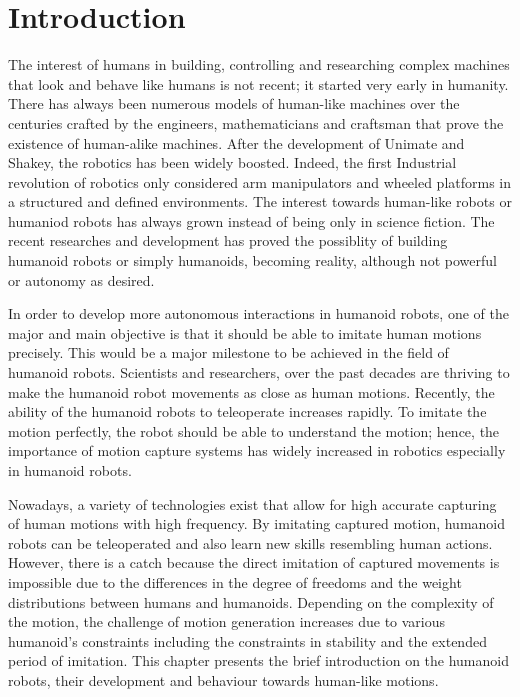 \chapter{Introduction}

The interest of humans in building, controlling and researching complex machines that look and behave like humans is not 
recent; it started very early in humanity. There has always been numerous models of human-like machines over the centuries 
crafted by the engineers, mathematicians and craftsman that prove the existence of human-alike machines. After the development 
of Unimate and Shakey, the robotics has been widely boosted. Indeed, the first Industrial revolution of robotics only considered 
arm manipulators and wheeled platforms in a structured and defined environments. The interest towards human-like robots or humaniod 
robots has always grown instead of being only in science fiction. The recent researches and development has proved the possiblity
of building humanoid robots or simply humanoids, becoming reality, although not powerful or autonomy as desired. 

 

In order to develop more autonomous interactions in humanoid robots, one of the major and main objective is that it should
be able to imitate human motions precisely. This would be a major milestone to be achieved in the field of humanoid robots.
Scientists and researchers, over the past decades are thriving to make the humanoid robot movements as close as human 
motions. Recently, the ability of the humanoid robots to teleoperate increases rapidly. To imitate the motion perfectly,
the robot should be able to understand the motion; hence, the importance of motion capture systems has widely increased
in robotics especially in humanoid robots.

 

Nowadays, a variety of technologies exist that allow for high accurate capturing of human motions with high frequency. 
By imitating captured motion, humanoid robots can be teleoperated and also learn new skills resembling human actions. 
However, there is a catch because the direct imitation of captured movements is impossible due to the differences in 
the degree of freedoms and the weight distributions between humans and humanoids. Depending on the complexity of the 
motion, the challenge of motion generation increases due to various humanoid's constraints including the constraints in 
stability and the extended period of imitation. This chapter presents the brief introduction on the humanoid robots, 
their development and behaviour towards human-like motions.


